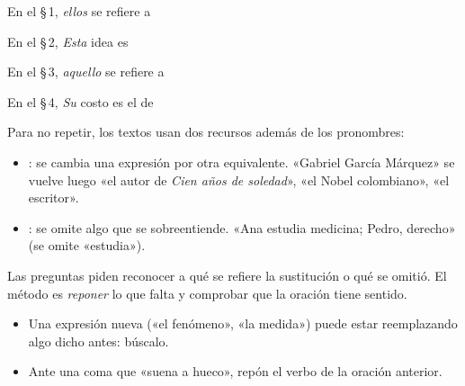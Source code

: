 \taller
{}
\begin{ejercicios}
\item En el \S\,1, \emph{ellos} se refiere a
\item En el \S\,2, \emph{Esta} idea es
\item En el \S\,3, \emph{aquello} se refiere a
\item En el \S\,4, \emph{Su} costo es el de
\end{ejercicios}

\bitacora


Para no repetir, los textos usan dos recursos además de los pronombres:
\begin{itemize}
  \item {}: se cambia una expresión por otra equivalente. «Gabriel García Márquez» se vuelve luego «el
  autor de \emph{Cien años de soledad}», «el Nobel colombiano», «el escritor».
  \item {}: se omite algo que se sobreentiende. «Ana estudia medicina; Pedro, derecho» (se omite
  «estudia»).
\end{itemize}
Las preguntas piden reconocer a qué se refiere la sustitución o qué se omitió. El método es \emph{reponer} lo que falta y
comprobar que la oración tiene sentido.

\begin{regla}
\begin{itemize}
  \item Una expresión nueva («el fenómeno», «la medida») puede estar reemplazando algo dicho antes: búscalo.
  \item Ante una coma que «suena a hueco», repón el verbo de la oración anterior.
\end{itemize}
\end{regla}

